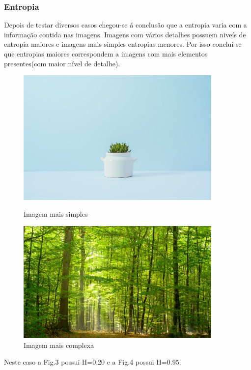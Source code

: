 \documentclass[12pt]{article}
\begin{document}
\subsubsection{Entropia}
Depois de testar diversos casos chegou-se á conclusão que a entropia varia com a informação contida nas imagens. Imagens com vários detalhes possuem niveís de entropia maiores e imagens mais simples entropias menores. Por isso conclui-se que entropias maiores correspondem a imagens com mais elementos presentes(com maior nível de detalhe).

\begin{figure}[htb!]
    \centering
    \begin{minipage}{0.45\textwidth}
        \centering
        \includegraphics[width=0.9\textwidth]{simples.jpg}
        \caption{Imagem mais simples}
    \end{minipage}\hfill
    \begin{minipage}{0.45\textwidth}
        \centering
        \includegraphics[width=0.9\textwidth]{floresta.jpg} 
        \caption{Imagem mais complexa}
    \end{minipage}
\end{figure}
\centering
Neste caso a Fig.3 possui H=0.20 e a Fig.4 possui H=0.95.
\flushleft
\newpage
\end{document}
